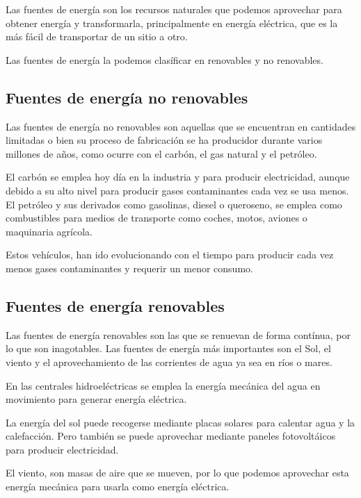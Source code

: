 Las fuentes de energía son los recursos naturales que podemos aprovechar para obtener energía y transformarla, principalmente en energía eléctrica, que es la más fácil de transportar de un sitio a otro.

Las fuentes de energía la podemos clasíficar en renovables y no renovables.

\subsection*{Fuentes de energía no renovables}

Las fuentes de energía no renovables son aquellas que se encuentran en cantidades limitadas o bien su proceso de fabricación se ha producidor durante varios millones de años, como ocurre con el carbón, el gas natural y el petróleo.

El carbón se emplea hoy día en la industria y para producir electricidad, aunque debido a su alto nivel para producir gases contaminantes cada vez se usa menos. El petróleo y sus derivados como gasolinas, diesel o queroseno, se emplea como combustibles para medios de transporte como coches, motos, aviones o maquinaria agrícola. 

Estos vehículos, han ido evolucionando con el tiempo para producir cada vez menos gases contaminantes y requerir un menor consumo.

\subsection*{Fuentes de energía renovables}

Las fuentes de energía renovables son las que se renuevan de forma contínua, por lo que son inagotables. Las fuentes de energía más importantes son el Sol, el viento y el aprovechamiento de las corrientes de agua ya sea en ríos o mares.

En las centrales hidroeléctricas se emplea la energía mecánica del agua en movimiento para generar energía eléctrica. 

La energía del sol puede recogerse mediante placas solares para calentar agua y la calefacción. Pero también se puede aprovechar mediante paneles fotovoltáicos para producir electricidad.

El viento, son masas de aire que se mueven, por lo que podemos aprovechar esta energía mecánica para usarla como energía eléctrica.

